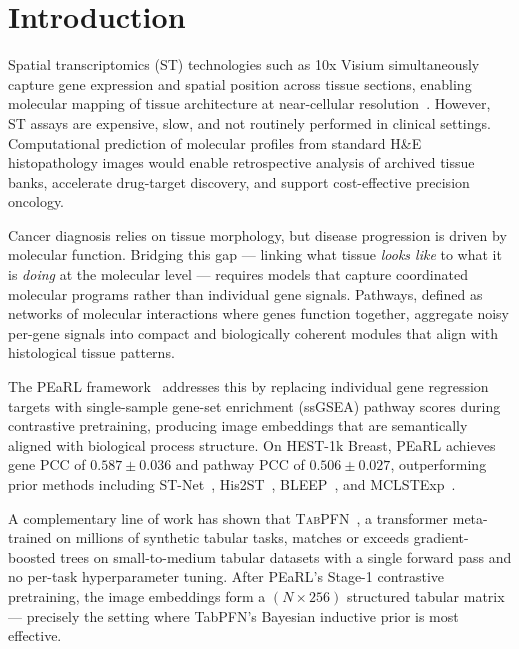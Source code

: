 \documentclass[conference]{IEEEtran}
\begin{document}
\section{Introduction}
\label{sec:intro}

Spatial transcriptomics (ST) technologies such as 10x Visium simultaneously
capture gene expression and spatial position across tissue sections, enabling
molecular mapping of tissue architecture at near-cellular resolution~\cite{hest1k}.
However, ST assays are expensive, slow, and not routinely performed in clinical
settings.
Computational prediction of molecular profiles from standard H\&E histopathology
images would enable retrospective analysis of archived tissue banks, accelerate
drug-target discovery, and support cost-effective precision oncology.

Cancer diagnosis relies on tissue morphology, but disease progression is driven
by molecular function.
Bridging this gap --- linking what tissue \textit{looks like} to what it is
\textit{doing} at the molecular level --- requires models that capture
coordinated molecular programs rather than individual gene signals.
Pathways, defined as networks of molecular interactions where genes function
together, aggregate noisy per-gene signals into compact and biologically
coherent modules that align with histological tissue patterns.

The PEaRL framework~\cite{pearl2025} addresses this by replacing individual
gene regression targets with single-sample gene-set enrichment (ssGSEA)
pathway scores during contrastive pretraining, producing image embeddings that
are semantically aligned with biological process structure.
On HEST-1k Breast, PEaRL achieves gene PCC of $0.587 \pm 0.036$ and pathway
PCC of $0.506 \pm 0.027$, outperforming prior methods including
ST-Net~\cite{stnet}, His2ST~\cite{his2st}, BLEEP~\cite{bleep}, and
MCLSTExp~\cite{mclstexp}.

A complementary line of work has shown that \textsc{TabPFN}~\cite{tabpfn2023},
a transformer meta-trained on millions of synthetic tabular tasks, matches or
exceeds gradient-boosted trees on small-to-medium tabular datasets with a
single forward pass and no per-task hyperparameter tuning.
After PEaRL's Stage-1 contrastive pretraining, the image embeddings form a
$(N \times 256)$ structured tabular matrix --- precisely the setting where
TabPFN's Bayesian inductive prior is most effective.
\end{document}
